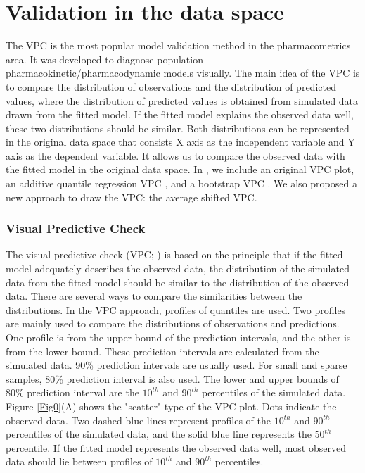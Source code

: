 \hypertarget{DS}{%
\section{Validation in the data space}\label{DS}}

The VPC is the most popular model validation method in the pharmacometrics area. It was developed to diagnose population pharmacokinetic/pharmacodynamic models visually.
The main idea of the VPC is to compare the distribution of observations and the distribution of predicted values, where the distribution of predicted values is obtained from simulated data drawn from the fitted model. If the fitted model explains the observed data well, these two distributions should be similar.
Both distributions can be represented in the original data space that consists X axis as the independent variable and Y axis as the dependent variable.
It allows us to compare the observed data with the fitted model in the original data space. In , we include an original VPC plot, an additive quantile regression VPC \citep{jamsen2018regression}, and a bootstrap VPC \citep{post2008extensions}. We also proposed a new approach to draw the VPC: the average shifted VPC.

\hypertarget{VPC}{%
\subsubsection{Visual Predictive Check}\label{VPC}}

The visual predictive check (VPC; \citealp*{karlsson2008tutorial}) is based on the principle that if the fitted model adequately describes the observed data, the distribution of the simulated data from the fitted model should be similar to the distribution of the observed data. There are several ways to compare the similarities between the distributions. In the VPC approach, profiles of quantiles are used. Two profiles are mainly used to compare the distributions of observations and predictions. One profile is from the upper bound of the prediction intervals, and the other is from the lower bound. These prediction intervals are calculated from the simulated data. 90\% prediction intervals are usually used. For small and sparse samples, 80\% prediction interval is also used. The lower and upper bounds of 80\% prediction interval are the $10^{th}$ and $90^{th}$ percentiles of the simulated data. Figure \ref{Fig0}(A) shows the "scatter" type of the VPC plot. Dots indicate the observed data. Two dashed blue lines represent profiles of the $10^{th}$ and $90^{th}$ percentiles of the simulated data, and the solid blue line represents the $50^{th}$ percentile. If the fitted model represents the observed data well, most observed data should lie between profiles of $10^{th}$ and $90^{th}$ percentiles.

